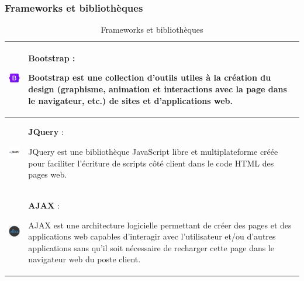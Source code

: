 \documentclass{article}
\begin{document}
                \subsubsection{Frameworks et bibliothèques}
                    \begin{table}[h!]
                        \centering
                        \begin{tabular}{|m{2cm}|m{15cm}|}
                            \hline
                            \includegraphics[width=2cm]{assets/logos/OIP (1).jpg} &
                            \textbf{Bootstrap} :
                            
                            Bootstrap est une collection d'outils utiles à la création du design (graphisme, animation et interactions avec la page dans le navigateur, etc.) de sites et d'applications web.\\
                            \hline
                            \includegraphics[width=2cm]{assets/logos/jq.png} &
                            \textbf{JQuery} :
                            
                            JQuery est une bibliothèque JavaScript libre et multiplateforme créée pour faciliter l'écriture de scripts côté client dans le code HTML des pages web. \\
                            \hline
                            \includegraphics[width=2cm]{assets/logos/ajax.png} &
                            \textbf{AJAX} :
                            
                            AJAX est une architecture logicielle permettant de créer des pages et des applications web capables d'interagir avec l'utilisateur et/ou d'autres applications sans qu'il soit nécessaire de recharger cette page dans le navigateur web du poste client.\\
                            \hline
                        \end{tabular}
                        \caption{Frameworks et bibliothèques}
                    \end{table}
                \FloatBarrier
\end{document}
